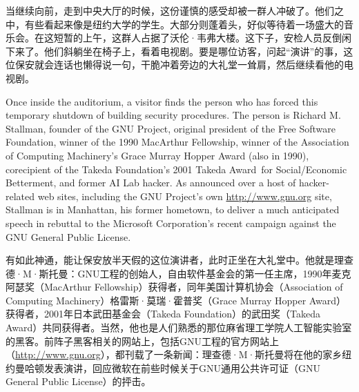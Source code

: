 \ifdefined\chs
当继续向前，走到中央大厅的时候，这份谨慎的感受却被一群人冲破了。他们之中，有些看起来像是纽约大学的学生。大部分则蓬着头，好似等待着一场盛大的音乐会。在这短暂的上午，这群人占据了沃伦·韦弗大楼。这下子，安检人员反倒闲下来了。他们斜躺坐在椅子上，看着电视剧。要是哪位访客，问起``演讲''的事，这位保安就会连话也懒得说一句，干脆冲着旁边的大礼堂一耸肩，然后继续看他的电视剧。
\fi

\ifdefined\eng
Once inside the auditorium, a visitor finds the person who has forced this temporary shutdown of building security procedures. The person is Richard M. Stallman, founder of the GNU Project, original president of the Free Software Foundation, winner of the 1990 MacArthur Fellowship, winner of the Association of Computing Machinery's Grace Murray Hopper Award (also in 1990), corecipient of the Takeda Foundation's 2001 Takeda Award\ifdefined\vtwo \ for Social/Economic Betterment\fi, and former AI Lab hacker. As announced over a host of hacker-related web sites, including the GNU Project's own \url{http://www.gnu.org} site, Stallman is in Manhattan, his former hometown, to deliver a much anticipated speech in rebuttal to the Microsoft Corporation's recent campaign against the GNU General Public License.
\fi

\ifdefined\chs
有如此神通，能让保安放半天假的这位演讲者，此时正坐在大礼堂中。他就是理查德·M·斯托曼：GNU工程的创始人，自由软件基金会的第一任主席，1990年麦克阿瑟奖（MacArthur Fellowship）获得者，同年美国计算机协会（Association of Computing Machinery）格雷斯·莫瑞·霍普奖（Grace Murray Hopper Award）获得者，2001年日本武田基金会（Takeda Foundation）的武田奖（Takeda Award）共同获得者。当然，他也是人们熟悉的那位麻省理工学院人工智能实验室的黑客。前阵子黑客相关的网站上，包括GNU工程的官方网站上（\url{http://www.gnu.org}），都刊载了一条新闻：理查德·M·斯托曼将在他的家乡纽约曼哈顿发表演讲，回应微软在前些时候关于GNU通用公共许可证（GNU General Public License）的抨击。
\fi

